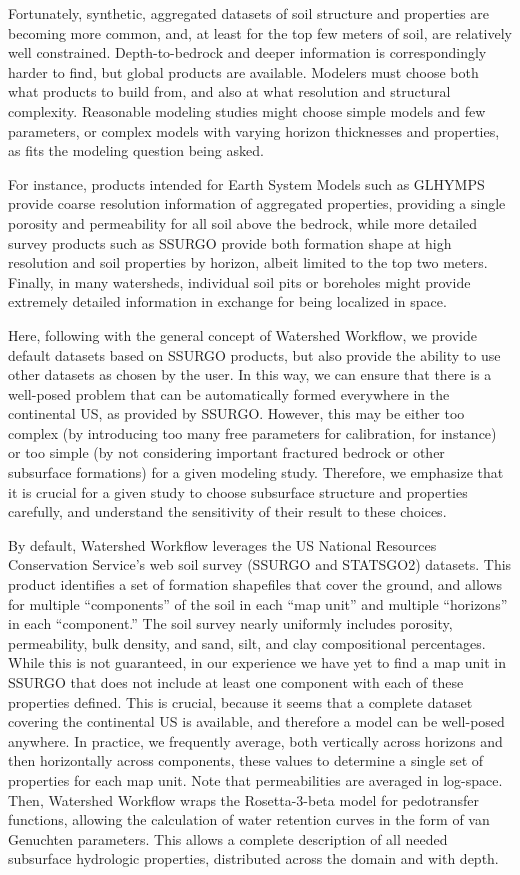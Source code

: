 \documentclass[a4paper,fleqn]{cas-dc}
\begin{document}
Fortunately, synthetic, aggregated datasets of soil structure and properties are becoming more common, and, at least for the top few meters of soil, are relatively well constrained.
Depth-to-bedrock and deeper information is correspondingly harder to find, but global products are available.
Modelers must choose both what products to build from, and also at what resolution and structural complexity.
Reasonable modeling studies might choose simple models and few parameters, or complex models with varying horizon thicknesses and properties, as fits the modeling question being asked.

For instance, products intended for Earth System Models such as GLHYMPS provide coarse resolution information of aggregated properties, providing a single porosity and permeability for all soil above the bedrock, while more detailed survey products such as SSURGO provide both formation shape at high resolution and soil properties by horizon, albeit limited to the top two meters.
Finally, in many watersheds, individual soil pits or boreholes might provide extremely detailed information in exchange for being localized in space.

Here, following with the general concept of Watershed Workflow, we provide default datasets based on SSURGO products, but also provide the ability to use other datasets as chosen by the user.
In this way, we can ensure that there is a well-posed problem that can be automatically formed everywhere in the continental US, as provided by SSURGO.
However, this may be either too complex (by introducing too many free parameters for calibration, for instance) or too simple (by not considering important fractured bedrock or other subsurface formations) for a given modeling study.
Therefore, we emphasize that it is crucial for a given study to choose subsurface structure and properties carefully, and understand the sensitivity of their result to these choices.

By default, Watershed Workflow leverages the US National Resources Conservation Service's web soil survey (SSURGO and STATSGO2) datasets.
This product identifies a set of formation shapefiles that cover the ground, and allows for multiple ``components'' of the soil in each ``map unit'' and multiple ``horizons'' in each ``component.''
The soil survey nearly uniformly includes porosity, permeability, bulk density, and sand, silt, and clay compositional percentages.
While this is not guaranteed, in our experience we have yet to find a map unit in SSURGO that does not include at least one component with each of these properties defined.
This is crucial, because it seems that a complete dataset covering the continental US is available, and therefore a model can be well-posed anywhere.
In practice, we frequently average, both vertically across horizons and then horizontally across components, these values to determine a single set of properties for each map unit.
Note that permeabilities are averaged in log-space.
Then, Watershed Workflow wraps the Rosetta-3-beta\cite{} model for pedotransfer functions, allowing the calculation of water retention curves in the form of van Genuchten parameters\cite{}.
This allows a complete description of all needed subsurface hydrologic properties, distributed across the domain and with depth.
\end{document}
